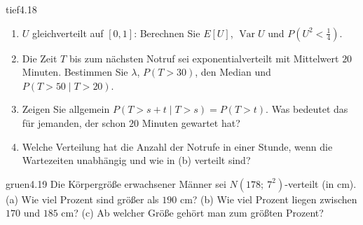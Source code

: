\begin{karte}{tief}{4.18}{\typtypisch}{}
\begin{enumerate}[label=(\alph*),leftmargin=1.6em,itemsep=2pt]
\item $U$ gleichverteilt auf $[0, 1]$: Berechnen Sie $E[U]$, $\operatorname{Var}U$ und $P(U^{2} < \frac14)$.
\item Die Zeit $T$ bis zum nächsten Notruf sei exponentialverteilt mit Mittelwert $20$ Minuten. Bestimmen Sie $\lambda$, $P(T > 30)$, den Median und $P(T > 50\mid T > 20)$.
\item Zeigen Sie allgemein $P(T > s + t\mid T > s) = P(T > t)$. Was bedeutet das für jemanden, der schon $20$ Minuten gewartet hat?
\item Welche Verteilung hat die Anzahl der Notrufe in einer Stunde, wenn die Wartezeiten unabhängig und wie in (b) verteilt sind?
\end{enumerate}
\end{karte}

\begin{karte}{gruen}{4.19}{\typwerk}{}
Die Körpergröße erwachsener Männer sei $N(178;\ 7^{2})$-verteilt (in cm). (a) Wie viel Prozent sind größer als $190$ cm? (b) Wie viel Prozent liegen zwischen $170$ und $185$ cm? (c) Ab welcher Größe gehört man zum größten Prozent?
\end{karte}

